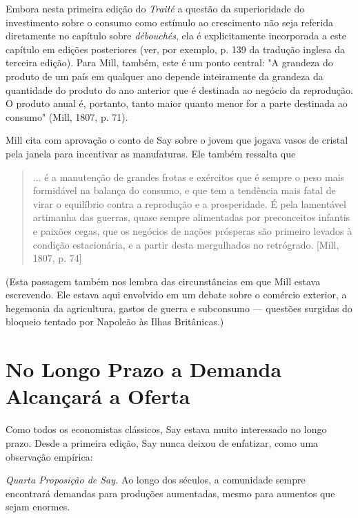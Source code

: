 \documentclass[12pt]{article}
\begin{document}
Embora nesta primeira edição do \textit{Traité} a questão da superioridade do investimento sobre o consumo como estímulo ao crescimento não seja referida diretamente no capítulo sobre \textit{débouchés}, ela é explicitamente incorporada a este capítulo em edições posteriores (ver, por exemplo, p. 139 da tradução inglesa da terceira edição). Para Mill, também, este é um ponto central: "A grandeza do produto de um país em qualquer ano depende inteiramente da grandeza da quantidade do produto do ano anterior que é destinada ao negócio da reprodução. O produto anual é, portanto, tanto maior quanto menor for a parte destinada ao consumo" (Mill, 1807, p. 71).

Mill cita com aprovação o conto de Say sobre o jovem que jogava vasos de cristal pela janela para incentivar as manufaturas. Ele também ressalta que

\begin{quote}
... é a manutenção de grandes frotas e exércitos que é sempre o peso mais formidável na balança do consumo, e que tem a tendência mais fatal de virar o equilíbrio contra a reprodução e a prosperidade. É pela lamentável artimanha das guerras, quase sempre alimentadas por preconceitos infantis e paixões cegas, que os negócios de nações prósperas são primeiro levados à condição estacionária, e a partir desta mergulhados no retrógrado. [Mill, 1807, p. 74]
\end{quote}

(Esta passagem também nos lembra das circunstâncias em que Mill estava escrevendo. Ele estava aqui envolvido em um debate sobre o comércio exterior, a hegemonia da agricultura, gastos de guerra e subconsumo — questões surgidas do bloqueio tentado por Napoleão às Ilhas Britânicas.)

\section{No Longo Prazo a Demanda Alcançará a Oferta}

Como todos os economistas clássicos, Say estava muito interessado no longo prazo. Desde a primeira edição, Say nunca deixou de enfatizar, como uma observação empírica:

\textit{Quarta Proposição de Say.} Ao longo dos séculos, a comunidade sempre encontrará demandas para produções aumentadas, mesmo para aumentos que sejam enormes.
\end{document}
